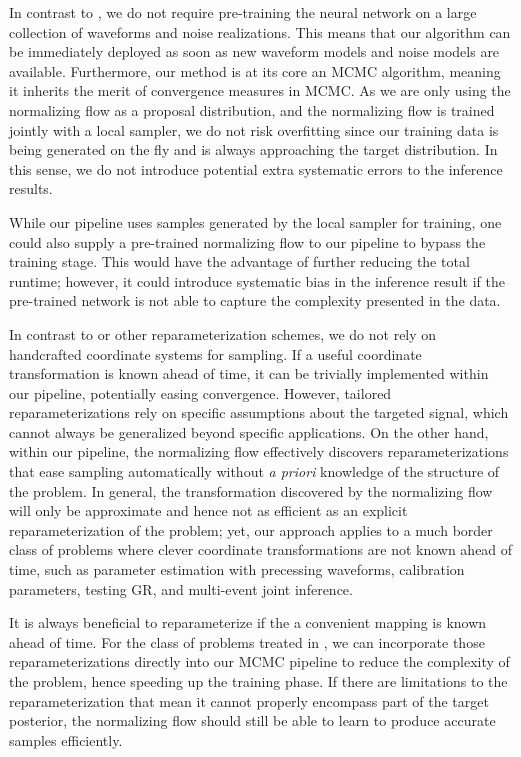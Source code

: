 \documentclass[twocolumn]{aastex631}
\begin{document}
In contrast to \cite{Dax:2021tsq,Dax:2022pxd}, we do not require pre-training
the neural network on a large collection of waveforms and noise realizations.
This means that our algorithm can be immediately deployed as soon as new
waveform models and noise models are available. Furthermore, our method is at
its core an MCMC algorithm, meaning it inherits the merit of convergence
measures in MCMC. As we are only using the normalizing flow as a proposal
distribution, and the normalizing flow is trained jointly with a local sampler,
we do not risk overfitting since our training data is being generated on the
fly and is always approaching the target distribution. In this sense, we do not
introduce potential extra systematic errors to the inference results.

While our pipeline uses samples generated by the local sampler for training,
one could also supply a pre-trained normalizing flow to our pipeline to bypass
the training stage. This would have the advantage of further reducing the total
runtime; however, it could introduce systematic bias in the inference result if
the pre-trained network is not able to capture the complexity presented in the
data.

In contrast to \cite{Islam:2022afg,Roulet:2022kot} or other reparameterization
schemes, we do not rely on handcrafted coordinate systems for sampling. If a
useful coordinate transformation is known ahead of time, it can be trivially
implemented within our pipeline, potentially easing convergence. However,
tailored reparameterizations rely on specific assumptions about the targeted
signal, which cannot always be generalized beyond specific applications. On the
other hand, within our pipeline, the normalizing flow effectively discovers
reparameterizations that ease sampling automatically without \emph{a priori}
knowledge of the structure of the problem. In general, the transformation
discovered by the normalizing flow will only be approximate and hence not as
efficient as an explicit reparameterization of the problem; yet, our approach
applies to a much border class of problems where clever coordinate
transformations are not known ahead of time, such as parameter estimation with
precessing waveforms, calibration parameters, testing GR, and multi-event joint
inference.

It is always beneficial to reparameterize if the a convenient mapping is known
ahead of time. For the class of problems treated in
\cite{Islam:2022afg,Roulet:2022kot}, we can incorporate those
reparameterizations directly into our MCMC pipeline to reduce the complexity of
the problem, hence speeding up the training phase. If there are limitations to
the reparameterization that mean it cannot properly encompass part of the
target posterior, the normalizing flow should still be able to learn to produce
accurate samples efficiently.
\end{document}
